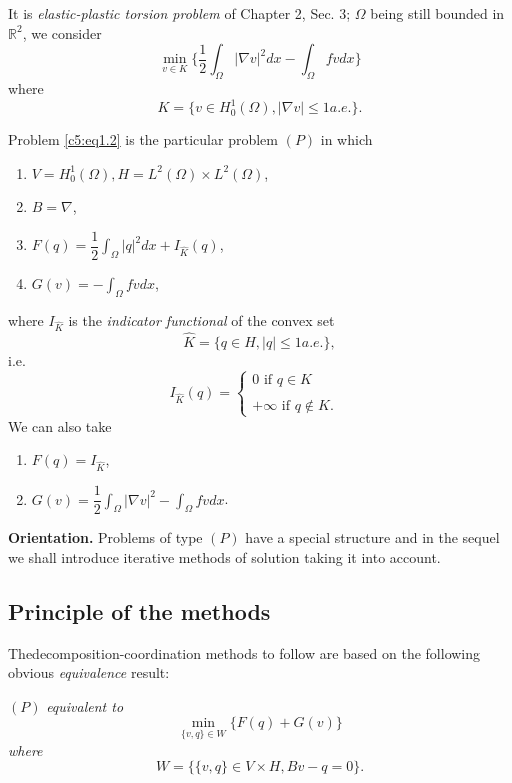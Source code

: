 \begin{example}\label{c5:exa2}%
It is {\em elastic-plastic torsion problem} of Chapter 2, Sec. 3; $\Omega$ being still bounded in $\mathbb{R}^2$, we consider 
\begin{equation}
\min_{v \in K}\{\frac{1}{2} \int_{\Omega}| \nabla v |^2 dx- \int_\Omega fv dx\} \tag{1.2}\label{c5:eq1.2}
\end{equation}
where 
$$
K = \{v \in H^1_0 (\Omega), | \nabla v | \leq 1 a.e.\}.
$$
\end{example}

Problem \eqref{c5:eq1.2} is the particular problem $(P)$ in which 
\begin{enumerate}[-]
\item $V = H^1_0(\Omega), H = L^2 (\Omega) \times L^2(\Omega)$,
\item $B = \nabla$,
\item $F(q)  = \dfrac{1}{2} \int_\Omega |q|^2 dx + I_{\hat{K}}(q)$,
\item $G(v)  = - \int_\Omega fv dx$,
\end{enumerate}
where $I_{\hat{K}}$ is the \textit{indicator functional} of the convex set 
$$
\hat{K} = \{ q \in H, |q| \leq 1 a.e.\},
$$
i.e.
\begin{equation*}
I_{\hat{K}}(q) =
\begin{cases}
0 \text{ if } q \in K\\
&\\
+\infty \text{ if }q \not \in K.
\end{cases}
\end{equation*}
We can also take
\begin{enumerate}[-]
\item $F (q)  = I_{\hat{K}}$,
\item $G(v)  = \dfrac{1}{2} \int_\Omega | \nabla v|^2 - \int_\Omega fv dx$.
\end{enumerate}
\textbf{Orientation.} Problems of type $(P)$ have a special structure and in the sequel we shall introduce iterative methods of solution taking it into account.

\subsection{Principle of the methods}\label{c5:ss1.2}%

The\pageoriginale  decomposition-coordination methods to follow are
based on the following obvious \textit{equivalence} result: 

\begin{theorem}\label{c5:thm1.1}%
$(P)$ {\em equivalent to}
\begin{equation}
 \min\limits_{\{v, q\} \in W } \{F (q) + G (v) \} \tag{$\Pi$}
\end{equation}
{\em where}
$$
W = \{\{ v, q\} \in V \times H, Bv-q = 0\}.
$$
\end{theorem}

